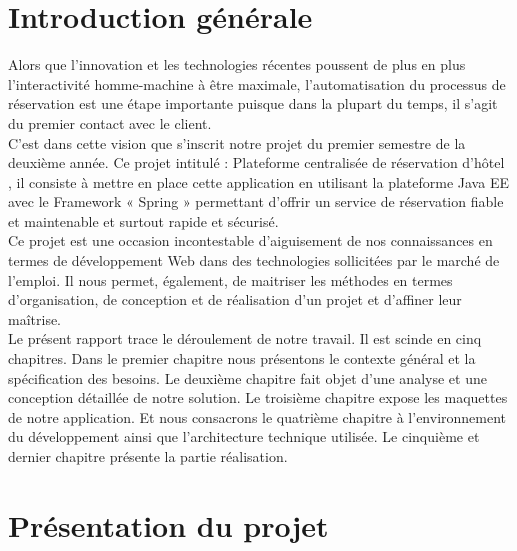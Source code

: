 \documentclass[12pt,a4paper]{report}
\begin{document}
	\chapter*{Introduction générale}
	Alors que l’innovation et les technologies récentes poussent de plus en plus l’interactivité
homme-machine à être maximale, l’automatisation du processus de réservation est une étape importante puisque dans la plupart du
temps, il s'agit du premier contact avec le client.\\
C’est dans cette vision que s’inscrit notre projet du premier semestre de la deuxième année. Ce projet
intitulé : \guillemotleft Plateforme centralisée de réservation d'hôtel \guillemotright , il consiste à mettre en place cette application en utilisant la plateforme Java EE avec le Framework « Spring » permettant d’offrir un service de réservation fiable et maintenable et surtout rapide et sécurisé.\\
Ce projet est une occasion incontestable d’aiguisement de nos connaissances en termes de développement Web dans des technologies sollicitées par le marché de l’emploi. Il nous permet, également, de maitriser les méthodes en termes d’organisation, de conception et de réalisation d’un projet et d’affiner leur maîtrise.\\
Le présent rapport trace le déroulement de notre travail. Il est scinde en cinq chapitres. Dans le premier chapitre nous présentons le contexte général et la spécification des besoins. Le deuxième chapitre fait objet d’une analyse et une conception détaillée de notre solution. Le troisième chapitre expose les maquettes de notre application. Et nous consacrons le quatrième chapitre à l’environnement du développement ainsi que l’architecture technique utilisée. Le cinquième et dernier chapitre présente la partie réalisation.\\
	

	
	





	

		\chapter{Présentation du projet}
		
\end{document}
